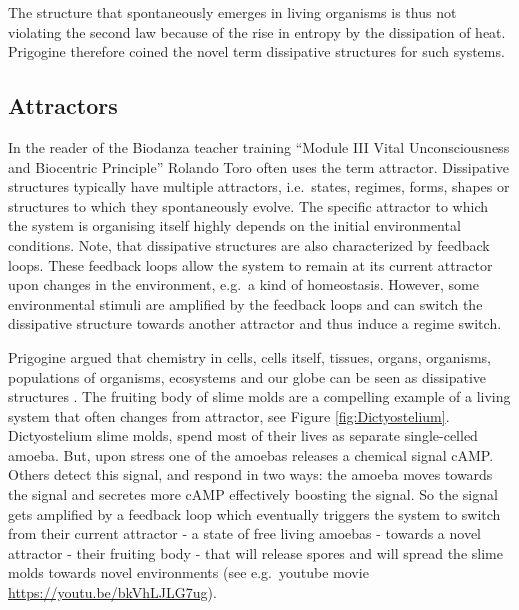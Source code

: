 \documentclass[
  11pt,
]{book}
\begin{document}
The structure that spontaneously emerges in living organisms is thus not violating the second law because of the rise in entropy by the dissipation of heat.
Prigogine therefore coined the novel term dissipative structures for such systems.

\hypertarget{attractors}{%
\subsection{Attractors}\label{attractors}}

In the reader of the Biodanza teacher training ``Module III Vital Unconsciousness and Biocentric Principle'' Rolando Toro often uses the term attractor. Dissipative structures typically have multiple attractors, i.e.~states, regimes, forms, shapes or structures to which they spontaneously evolve. The specific attractor to which the system is organising itself highly depends on the initial environmental conditions.
Note, that dissipative structures are also characterized by feedback loops.
These feedback loops allow the system to remain at its current attractor upon changes in the environment, e.g.~a kind of homeostasis.
However, some environmental stimuli are amplified by the feedback loops and can switch the dissipative structure towards another attractor and thus induce a regime switch.

Prigogine argued that chemistry in cells, cells itself, tissues, organs, organisms, populations of organisms, ecosystems and our globe can be seen as dissipative structures \citep{prigogineStengers1984}.
The fruiting body of slime molds are a compelling example of a living system that often changes from attractor, see Figure \ref{fig:Dictyostelium}. Dictyostelium slime molds, spend most of their lives as separate single-celled amoeba. But, upon stress one of the amoebas releases a chemical signal cAMP. Others detect this signal, and respond in two ways: the amoeba moves towards the signal and secretes more cAMP effectively boosting the signal. So the signal gets amplified by a feedback loop which eventually triggers the system to switch from their current attractor - a state of free living amoebas - towards a novel attractor - their fruiting body - that will release spores and will spread the slime molds towards novel environments (see e.g.~youtube movie \url{https://youtu.be/bkVhLJLG7ug}).
\end{document}
